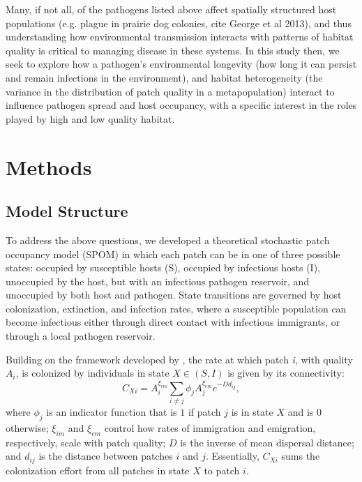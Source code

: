 \documentclass{svjour3}
\begin{document}
Many, if not all, of the pathogens listed above affect spatially structured host populations (e.g. plague in prairie dog colonies, cite George et al 2013), and thus understanding how environmental transmission interacts with patterns of habitat quality is critical to managing disease in these systems.  In this study then, we seek to explore how a pathogen's environmental longevity (how long it can persist and remain infections in the environment), and habitat heterogeneity (the variance in the distribution of patch quality in a metapopulation) interact to influence pathogen spread and host occupancy, with a specific interest in the roles played by high and low quality habitat.  

\section{Methods}
\label{methods}

\subsection{Model Structure}
To address the above questions, we developed a theoretical stochastic patch occupancy model (SPOM) in which each patch can be in one of three possible states: occupied by susceptible hosts (S), occupied by infectious hosts (I), unoccupied by the host, but with an infectious pathogen reservoir, and unoccupied by both host and pathogen.  State transitions are governed by host colonization, extinction, and infection rates, where a susceptible population can become infectious either through direct contact with infectious immigrants, or through a local pathogen reservoir.  

Building on the framework developed by \cite{Hanski2003}, the rate at which patch \emph{i}, with quality $A_i$, is colonized by individuals in state $X \in (S,I)$ is given by its connectivity:
\begin{equation}
C_{Xi}=A_i^{\xi_{im}} \sum_{i\neq j }\phi_jA_j^{\xi_{em}}e^{-D d_{ij}},
\label{connectivity}
\end{equation}
where $\phi_j$ is an indicator function that is $1$ if patch $j$ is in state $X$ and is $0$ otherwise; $\xi_{im}$ and $\xi_{em}$ control how rates of immigration and emigration, respectively, scale with patch quality; $D$ is the inverse of mean dispersal distance; and $d_{ij}$ is the distance between patches $i$ and $j$.  Essentially, $C_{Xi}$ sums the colonization effort from all patches in state $X$ to patch $i$.  
\end{document}
